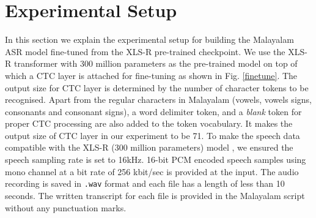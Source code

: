 \documentclass[runningheads]{llncs}
\begin{document}




\section{Experimental Setup}

In this section we explain the experimental setup for building the Malayalam ASR model fine-tuned from the XLS-R pre-trained checkpoint. We use the  XLS-R  transformer with 300 million parameters as the pre-trained model on top of which a CTC layer is attached for fine-tuning as shown in Fig. \ref{finetune}. The output size for CTC layer is determined by the number of character tokens to be recognised. Apart from the regular characters in Malayalam (vowels, vowels signs, consonants and consonant signs), a word delimiter token, and a \textit{blank} token for proper CTC processing are also added to the token vocabulary. It makes the output size of CTC layer in our experiment to be 71. To make the speech data compatible with the XLS-R (300 million parameters) model \cite{babu2021xls}, we ensured the speech sampling rate is set to 16kHz.  16-bit PCM encoded speech samples using mono channel at a bit rate of 256 kbit/sec is provided at the input. The audio recording is saved in \texttt{.wav} format and each file has a length of less than 10 seconds. The written transcript for each file is provided in the Malayalam script without any punctuation marks.
\end{document}
